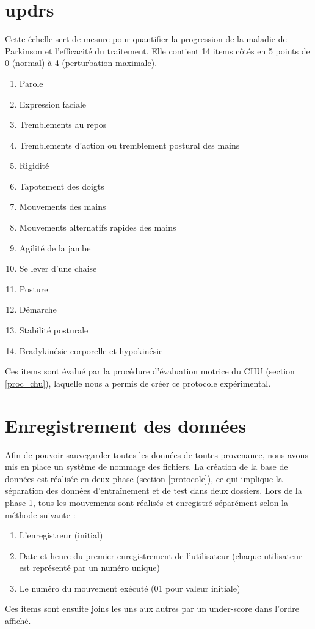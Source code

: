 \documentclass{article}
\begin{document}
\section{\acrlong{updrs}}

Cette échelle sert de mesure pour quantifier la progression de la maladie de Parkinson et l'efficacité du traitement. Elle contient 14 items côtés en 5 points de 0 (normal) à 4 (perturbation maximale). 

\begin{enumerate}
	\item Parole
	\item Expression faciale
	\item Tremblements au repos
	\item Tremblements d'action ou tremblement postural des mains
	\item Rigidité
	\item Tapotement des doigts 
	\item Mouvements des mains 
	\item Mouvements alternatifs rapides des mains
	\item Agilité de la jambe
	\item Se lever d'une chaise
	\item Posture
	\item Démarche
	\item Stabilité posturale
	\item Bradykinésie corporelle et hypokinésie
\end{enumerate}

Ces items sont évalué par la procédure d'évaluation motrice du CHU (section \ref{proc_chu}), laquelle nous a permis de créer ce protocole expérimental.

\section{Enregistrement des données}
\label{nommage_data}

Afin de pouvoir sauvegarder toutes les données de toutes provenance, nous avons mis en place un système de nommage des fichiers. La création de la base de données est réalisée en deux phase (section \ref{protocole}), ce qui implique la séparation des données d'entraînement et de test dans deux dossiers. Lors de la phase 1, tous les mouvements sont réalisés et enregistré séparément selon la méthode suivante :
\begin{enumerate}
	\item L'enregistreur (initial)
	\item Date et heure du premier enregistrement de l'utilisateur (chaque utilisateur est représenté par un numéro unique)
	\item Le numéro du mouvement exécuté (01 pour valeur initiale) 
\end{enumerate}
Ces items sont ensuite joins les uns aux autres par un under-score dans l'ordre affiché.
\end{document}
